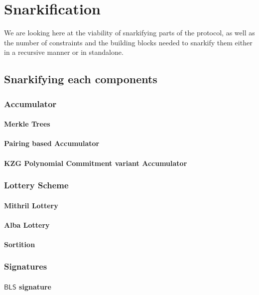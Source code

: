 \documentclass{article}
\newcommand{\BLS}{\ensuremath{\mathsf{BLS}}\xspace}
\begin{document}
%
%
%
\section{Snarkification}
We are looking here at the viability of snarkifying parts of the protocol, as well as the number of constraints and the building blocks needed to snarkify them either in a recursive manner or in standalone.

%
%
\subsection{Snarkifying each components}

%
\subsubsection{Accumulator}
\paragraph{Merkle Trees}
\paragraph{Pairing based Accumulator}
\paragraph{KZG Polynomial Commitment variant Accumulator}

%
\subsubsection{Lottery Scheme}
\paragraph{Mithril Lottery}
\paragraph{Alba Lottery}
\paragraph{Sortition}

%
\subsubsection{Signatures}
\paragraph{\BLS signature}
\end{document}
